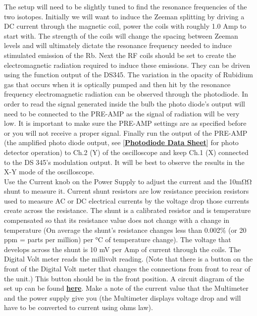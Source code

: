 \documentclass{../lab}
\newcommand{\PhotodiodeDataSheet}{http://physics111.lib.berkeley.edu/Physics111/Reprints/OPT/Photodiodes-10DP.pdf}
\newcommand{\CircuitForMagneticCoils}{http://experimentationlab.berkeley.edu/sites/default/files/OPT/Circuitformagnetic\%20coils.png}
\begin{document}
The setup will need to be slightly tuned to find the resonance frequencies of the two isotopes. Initially we will want to induce the Zeeman splitting by driving a DC current through the magnetic coil, power the coils with roughly 1.0 Amp to start with. The strength of the coils will change the spacing between Zeeman levels and will ultimately dictate the resonance frequency needed to induce stimulated emission of the Rb. Next the RF coils should be set to create the electromagnetic radiation required to induce these emissions. They can be driven using the function output of the DS345. The variation in the opacity of Rubidium gas that occurs when it is optically pumped and then hit by the resonance frequency electromagnetic radiation can be observed through the photodiode. In order to read the signal generated inside the bulb the photo diode's output will need to be connected to the PRE-AMP as the signal of radiation will be very low. It is important to make sure the PRE-AMP settings are as specified before or you will not receive a proper signal. Finally run the output of the PRE-AMP (the amplified photo diode output, see [\href{\PhotodiodeDataSheet}{\textbf{Photodiode Data Sheet}}] for photo detector operation) to Ch.2 (Y) of the oscilloscope and keep Ch.1 (X) connected to the DS 345's modulation output. It will be best to observe the results in the X-Y mode of the oscilloscope. \\

Use the Current knob on the Power Supply to adjust the current and the 10mΩΩ shunt to measure it. Current shunt resistors are low resistance precision resistors used to measure AC or DC electrical currents by the voltage drop those currents create across the resistance. The shunt is a calibrated resistor and is temperature compensated so that its resistance value does not change with a change in temperature (On average the shunt's resistance changes less than 0.002\% (or 20 ppm = parts per million) per °C of temperature change). The voltage that develops across the shunt is 10 mV per Amp of current through the coils. The Digital Volt meter reads the millivolt reading. (Note that there is a button on the front of the Digital Volt meter that changes the connections from front to rear of the unit.) This button should be in the front position. A circuit diagram of the set up can be found \href{\CircuitForMagneticCoils}{\textbf{here}}. Make a note of the current value that the Multimeter and the power supply give you (the Multimeter displays voltage drop and will have to be converted to current using ohms law).
\end{document}
